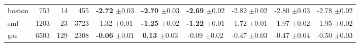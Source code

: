 \begin{table}[h]
\begin{threeparttable}
\begin{tabular}{lrrrcccccc}
    \textsf{boston} & 753 & 14 & 455 & {\bf-2.72 {\scriptsize{\(\pm 0.03\)}}} & {\bf-2.70 {\scriptsize{\(\pm 0.03\)}}} & {\bf-2.69 {\scriptsize{\(\pm 0.02\)}}} & {-2.82 {\scriptsize{\(\pm 0.02\)}}} & {-2.80 {\scriptsize{\(\pm 0.03\)}}} & {-2.78 {\scriptsize{\(\pm 0.02\)}}}\\
    \textsf{sml} & 1203 & 23 & 3723 & {-1.32 {\scriptsize{\(\pm 0.01\)}}} & {\bf-1.25 {\scriptsize{\(\pm 0.02\)}}} & {\bf-1.22 {\scriptsize{\(\pm 0.01\)}}} & {-1.72 {\scriptsize{\(\pm 0.01\)}}} & {-1.97 {\scriptsize{\(\pm 0.02\)}}} & {-1.95 {\scriptsize{\(\pm 0.02\)}}} \\
    \textsf{gas} & 6503 & 129 & 2308 & {\bf-0.06 {\scriptsize{\(\pm 0.01\)}}} & {\bf 0.13 {\scriptsize{\(\pm 0.03\)}}} & {-0.09 {\scriptsize{\(\pm 0.02\)}}} & {-0.47 {\scriptsize{\(\pm 0.03\)}}} & {-0.47 {\scriptsize{\(\pm 0.04\)}}} & {-0.50 {\scriptsize{\(\pm 0.03\)}}}\\
    \bottomrule
 \end{tabular}
  \end{threeparttable}
\end{table}

